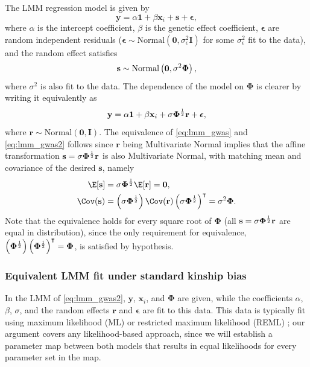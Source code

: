 \documentclass[11pt]{article}
\newcommand{\kinMat}{%
  \ensuremath{%
    \mathbf{\Phi}
  }%
  \xspace%
}%
\begin{document}
The LMM regression model is given by
\begin{equation}
  \label{eq:lmm_gwas}
  \mathbf{y}
  =
  \alpha \mathbf{1} + \beta \mathbf{x}_i + \mathbf{s} + \boldsymbol{\epsilon}
  ,
\end{equation}
where $\alpha$ is the intercept coefficient,
$\beta$ is the genetic effect coefficient,
$\boldsymbol{\epsilon}$ are random independent residuals ($\boldsymbol{\epsilon} \sim \text{Normal}(\mathbf{0}, \sigma^2_\epsilon \mathbf{I})$ for some $\sigma^2_\epsilon$ fit to the data),
and the random effect satisfies \citep{sul_population_2018}
$$
\mathbf{s} \sim \text{Normal} \left( \mathbf{0}, \sigma^2 \kinMat \right),
$$
where $\sigma^2$ is also fit to the data.
The dependence of the model on \kinMat is clearer by writing it equivalently as
\begin{equation}
  \label{eq:lmm_gwas2}
  \mathbf{y}
  =
  \alpha \mathbf{1} + \beta \mathbf{x}_i + \sigma \kinMat^\frac{1}{2} \mathbf{r} + \boldsymbol{\epsilon}
  ,
\end{equation}
where $\mathbf{r} \sim \text{Normal} \left( \mathbf{0}, \mathbf{I} \right)$.
The equivalence of \cref{eq:lmm_gwas} and \cref{eq:lmm_gwas2} follows since $\mathbf{r}$ being Multivariate Normal implies that the affine transformation $\mathbf{s} = \sigma \kinMat^\frac{1}{2} \mathbf{r}$ is also Multivariate Normal, with matching mean and covariance of the desired $\mathbf{s}$, namely
\begin{align*}
  \E[ \mathbf{s} ]
  &=
    \sigma \kinMat^\frac{1}{2} \E[ \mathbf{r} ]
    = \mathbf{0},
  \\
  \Cov( \mathbf{s} )
  &= \left( \sigma \kinMat^\frac{1}{2} \right) \Cov( \mathbf{r} ) \left( \sigma \kinMat^\frac{1}{2} \right)^\intercal
    = \sigma^2 \kinMat
    .
\end{align*}
Note that the equivalence holds for every square root of \kinMat (all $\mathbf{s} = \sigma \kinMat^\frac{1}{2} \mathbf{r}$ are equal in distribution), since the only requirement for equivalence,
$\left( \kinMat^\frac{1}{2} \right) \left( \kinMat^\frac{1}{2} \right)^\intercal = \kinMat$,
is satisfied by hypothesis.

\subsubsection{Equivalent LMM fit under standard kinship bias}

In the LMM of \cref{eq:lmm_gwas2}, $\mathbf{y}$, $\mathbf{x}_i$, and \kinMat are given, while the coefficients $\alpha$, $\beta$, $\sigma$, and the random effects $\mathbf{r}$ and $\boldsymbol{\epsilon}$ are fit to this data.
This data is typically fit using maximum likelihood (ML) or restricted maximum likelihood (REML) \citep{kang_efficient_2008}; our argument covers any likelihood-based approach, since we will establish a parameter map between both models that results in equal likelihoods for every parameter set in the map.
\end{document}
